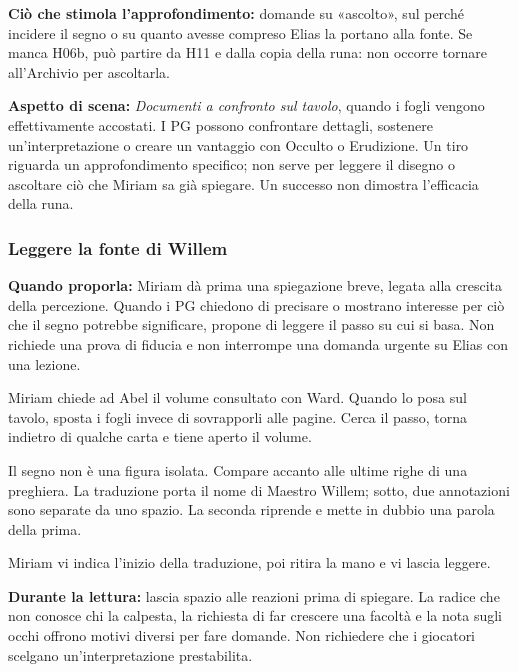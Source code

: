 \documentclass[11pt,a4paper]{article}
\newcommand{\aspect}[1]{\textit{\textcolor{blood}{#1}}}
\begin{document}
\textbf{Ciò che stimola l'approfondimento:} domande su «ascolto», sul perché incidere il segno o su quanto avesse compreso Elias la portano alla fonte. Se manca H06b, può partire da H11 e dalla copia della runa: non occorre tornare all'Archivio per ascoltarla.

\begin{fatebox}
\textbf{Aspetto di scena:} \aspect{Documenti a confronto sul tavolo}, quando i fogli vengono effettivamente accostati. I PG possono confrontare dettagli, sostenere un'interpretazione o creare un vantaggio con Occulto o Erudizione. Un tiro riguarda un approfondimento specifico; non serve per leggere il disegno o ascoltare ciò che Miriam sa già spiegare. Un successo non dimostra l'efficacia della runa.
\end{fatebox}

\subsubsection{Leggere la fonte di Willem}
\textbf{Quando proporla:} Miriam dà prima una spiegazione breve, legata alla crescita della percezione. Quando i PG chiedono di precisare o mostrano interesse per ciò che il segno potrebbe significare, propone di leggere il passo su cui si basa. Non richiede una prova di fiducia e non interrompe una domanda urgente su Elias con una lezione.

\begin{readaloud}
Miriam chiede ad Abel il volume consultato con Ward. Quando lo posa sul tavolo, sposta i fogli invece di sovrapporli alle pagine. Cerca il passo, torna indietro di qualche carta e tiene aperto il volume.

Il segno non è una figura isolata. Compare accanto alle ultime righe di una preghiera. La traduzione porta il nome di Maestro Willem; sotto, due annotazioni sono separate da uno spazio. La seconda riprende e mette in dubbio una parola della prima.

Miriam vi indica l'inizio della traduzione, poi ritira la mano e vi lascia leggere.
\end{readaloud}



\textbf{Durante la lettura:} lascia spazio alle reazioni prima di spiegare. La radice che non conosce chi la calpesta, la richiesta di far crescere una facoltà e la nota sugli occhi offrono motivi diversi per fare domande. Non richiedere che i giocatori scelgano un'interpretazione prestabilita.
\end{document}
